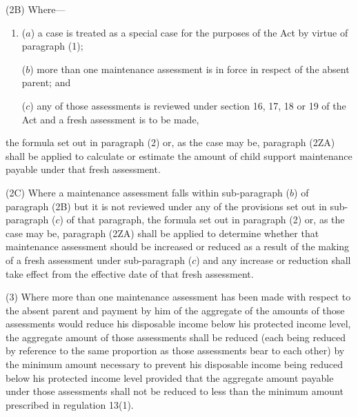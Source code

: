 \documentclass[12pt,a4paper]{article}
\begin{document}
(2B) Where—
\begin{enumerate}\item[]
($a$) a case is treated as a special case for the purposes of the Act by virtue of paragraph (1);

($b$) more than one maintenance assessment is in force in respect of the absent parent; and

($c$) any of those assessments is reviewed under section 16, 17, 18 or 19 of the Act and a fresh assessment is to be made,
\end{enumerate}
the formula set out in paragraph (2) or, as the case may be, paragraph (2ZA) shall be applied to calculate or estimate the amount of child support maintenance payable under that fresh assessment.

(2C) Where a maintenance assessment falls within sub-\hspace{0pt}paragraph ($b$) of paragraph (2B) but it is not reviewed under any of the provisions set out in sub-paragraph ($c$) of that paragraph, the formula set out in paragraph (2) or, as the case may be, paragraph (2ZA) shall be applied to determine whether that maintenance assessment should be increased or reduced as a result of the making of a fresh assessment under sub-paragraph ($c$) and any increase or reduction shall take effect from the effective date of that fresh assessment.

(3) Where more than one maintenance assessment has been made with respect to the absent parent and payment by him of the aggregate of the amounts of those assessments would reduce his disposable income below his protected income level, the aggregate amount of those assessments shall be reduced (each being reduced by reference to the same proportion as those assessments bear to each other) by the minimum amount necessary to prevent his disposable income being reduced below his protected income level provided that the aggregate amount payable under those assessments shall not be reduced to less than the minimum amount prescribed in regulation 13(1).
\end{document}
